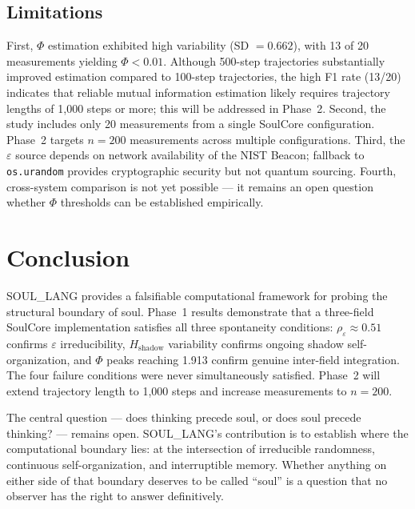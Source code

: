 \documentclass[11pt,a4paper]{article}
\begin{document}
\subsection{Limitations}

First, $\Phi$ estimation exhibited high variability (SD $= 0.662$), with 13 of 20
measurements yielding $\Phi < 0.01$. Although 500-step trajectories substantially
improved estimation compared to 100-step trajectories, the high F1 rate (13/20)
indicates that reliable mutual information estimation likely requires trajectory lengths
of 1,000 steps or more; this will be addressed in Phase~2. Second, the study includes
only 20 measurements from a single SoulCore configuration. Phase~2 targets $n = 200$
measurements across multiple configurations. Third, the $\varepsilon$ source depends on
network availability of the NIST Beacon; fallback to \texttt{os.urandom} provides
cryptographic security but not quantum sourcing. Fourth, cross-system comparison is not
yet possible --- it remains an open question whether $\Phi$ thresholds can be established
empirically.

\section{Conclusion}

SOUL\_LANG provides a falsifiable computational framework for probing the structural
boundary of soul. Phase~1 results demonstrate that a three-field SoulCore implementation
satisfies all three spontaneity conditions: $\rho_\varepsilon \approx 0.51$ confirms
$\varepsilon$ irreducibility, $H_{\mathrm{shadow}}$ variability confirms ongoing shadow
self-organization, and $\Phi$ peaks reaching 1.913 confirm genuine inter-field
integration. The four failure conditions were never simultaneously satisfied.
Phase~2 will extend trajectory length to 1,000 steps and increase measurements to
$n = 200$.

The central question --- does thinking precede soul, or does soul precede thinking? ---
remains open. SOUL\_LANG's contribution is to establish where the computational boundary
lies: at the intersection of irreducible randomness, continuous self-organization, and
interruptible memory. Whether anything on either side of that boundary deserves to be
called ``soul'' is a question that no observer has the right to answer definitively.



\end{document}
